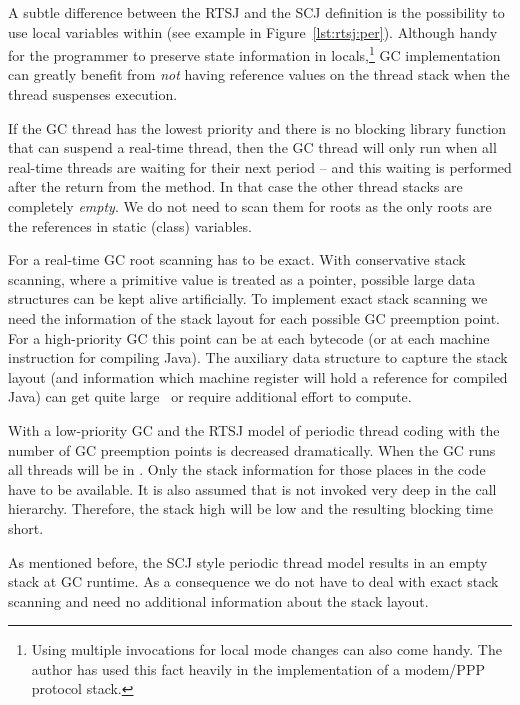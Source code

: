 A subtle difference between the RTSJ and the SCJ definition is the
possibility to use local variables within  (see example
in Figure~\ref{lst:rtsj:per}). Although handy for the programmer to
preserve state information in locals,\footnote{Using multiple
 invocations for local mode changes can also come handy.
The author has used this fact heavily in the implementation of a
modem/PPP protocol stack.}
GC implementation can greatly benefit from \emph{not} having
reference values on the thread stack when the thread suspenses
execution.

If the GC thread has the lowest priority and there is no blocking
library function that can suspend a real-time thread, then the GC
thread will only run when all real-time threads are waiting for
their next period -- and this waiting is performed after the return
from the  method.  In that case the other thread stacks
are completely \emph{empty}. We do not need to scan them for roots
as the only roots are the references in static (class) variables.

For a real-time GC root scanning has to be exact. With conservative
stack scanning, where a primitive value is treated as a pointer,
possible large data structures can be kept alive artificially. To
implement exact stack scanning we need the information of the stack
layout for each possible GC preemption point. For a high-priority GC
this point can be at each bytecode (or at each machine instruction
for compiling Java). The auxiliary data structure to capture the
stack layout (and information which machine register will hold a
reference for compiled Java) can get quite large~\cite{jop:gcroots}
or require additional effort to compute.

With a low-priority GC and the RTSJ model of periodic thread coding
with  the number of GC preemption points is decreased
dramatically. When the GC runs all threads will be in .
Only the stack information for those places in the code have to be
available. It is also assumed that  is not invoked very
deep in the call hierarchy. Therefore, the stack high will be low
and the resulting blocking time short.

As mentioned before, the SCJ style periodic thread model results in
an empty stack at GC runtime. As a consequence we do not have to
deal with exact stack scanning and need no additional information
about the stack layout.

